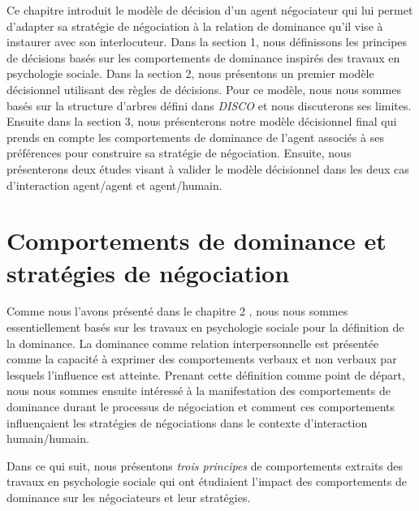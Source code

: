 	\label{chap:dec}
	
	Ce chapitre introduit le modèle de décision d'un agent négociateur qui lui permet d'adapter sa stratégie de négociation à la relation de dominance qu'il vise à instaurer avec son interlocuteur. Dans la section 1, nous définissons les principes de décisions basés sur les comportements de dominance inspirés des travaux en psychologie sociale. Dans la section 2, nous présentons un premier modèle décisionnel utilisant des règles de décisions.  Pour ce modèle, nous nous sommes basés sur la structure d'arbres défini dans \emph{DISCO} \cite{rich09} et nous discuterons ses limites. Ensuite dans la section 3, nous présenterons notre modèle décisionnel final qui prends en compte les comportements de dominance de l'agent associés à ses préférences pour construire sa stratégie de négociation. Ensuite, nous présenterons deux études visant à valider le modèle décisionnel dans les deux cas d'interaction agent/agent et agent/humain.
	
	\section{Comportements de dominance et stratégies de négociation}
	\label{chap:domer}
	Comme nous l'avons présenté dans le chapitre 2  %
	, nous nous sommes essentiellement basés sur les travaux en psychologie sociale pour la définition de la dominance. 
	La dominance comme relation interpersonnelle est présentée comme la capacité à exprimer des comportements verbaux et non verbaux par lesquels  l'influence est atteinte. Prenant cette définition comme point de départ, nous nous sommes ensuite intéressé à la manifestation des comportements de dominance durant le processus de négociation et comment ces comportements influençaient les stratégies de négociations dans le contexte d'interaction humain/humain. 
	
	Dans ce qui suit, nous présentons \emph{trois principes} de comportements extraits des travaux en psychologie sociale qui ont étudiaient l'impact des comportements de dominance sur les négociateurs et leur stratégies.
	
